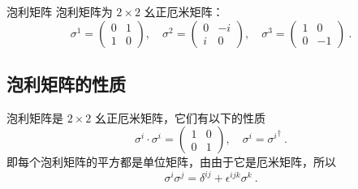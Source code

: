 \begin{definition}{泡利矩阵}
泡利矩阵为 $2\times 2$ 幺正厄米矩阵：
\begin{equation}
\sigma^1 = \begin{pmatrix}
0 & 1\\
1 & 0
\end{pmatrix},\quad 
\sigma^2 = \begin{pmatrix}
0 & -i\\
i & 0
\end{pmatrix},\quad 
\sigma^3 = 
\begin{pmatrix}
1 & 0\\
0 & -1
\end{pmatrix}
~.
\end{equation}
\end{definition}

\subsection{泡利矩阵的性质}
泡利矩阵是 $2\times 2$ 幺正厄米矩阵，它们有以下的性质
\begin{equation}
\sigma^i\cdot \sigma^i = \begin{pmatrix}1&0\\0&1\end{pmatrix},\quad \sigma^i = {\sigma^i}^\dagger~.
\end{equation}
即每个泡利矩阵的平方都是单位矩阵，由由于它是厄米矩阵，所以
\begin{equation}
\sigma^i\sigma^j = \delta^{ij} + \epsilon^{ijk}\sigma^k~.
\end{equation}
